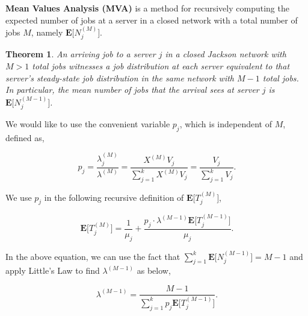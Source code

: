 \documentclass[a4paper, 12pt]{article}
\newtheorem{theorem}{Theorem}
\begin{document}
\textbf{Mean Values Analysis (MVA)} is a method for recursively computing the
expected number of jobs at a server in a closed network with a total number of
jobs $M$, namely $\textbf{E}\big[N_j^{(M)}\big]$.

\begin{theorem}
        An arriving job to a server $j$ in a closed Jackson network with
        $M > 1$ total jobs witnesses a job distribution at each server
        equivalent to that server's steady-state job distribution in the same
        network with $M - 1$ total jobs. In particular, the mean number of jobs
        that the arrival sees at server $j$ is
        $\textbf{E}\Big[N_j^{(M - 1)}\Big]$.
\end{theorem}

We would like to use the convenient variable $p_j$, which is independent of $M$, defined as,

\begin{equation}
        p_j = \frac{\lambda_j^{(M)}}{\lambda^{(M)}} =
                \frac{X^{(M)} V_j}{\sum_{j = 1}^{k} X^{(M)} V_j} =
                \frac{V_j}{\sum_{j = 1}^{k} V_j}.
\end{equation}

We use $p_j$ in the following recursive definition of $\textbf{E}\Big[T_j^{(M)}\Big]$,

\begin{equation}
        \textbf{E}\Big[T_j^{(M)}\Big] =
                \frac{1}{\mu_j} + \frac{p_j\cdot \lambda^{(M - 1)} \textbf{E}\Big[T_j^{(M - 1)}\Big]}{\mu_j}.
\end{equation}

In the above equation, we can use the fact that
$\sum_{j = 1}^{k} \textbf{E} \Big[ N_j^{(M - 1)} \Big] = M - 1$ and apply
Little's Law to find $\lambda^{(M - 1)}$ as below,

\begin{equation}
        \lambda^{(M - 1)} = \frac{M - 1}{\sum_{j = 1}^k p_j \textbf{E} \Big[ T_j^{(M - 1)} \Big]}.
\end{equation}



\end{document}
